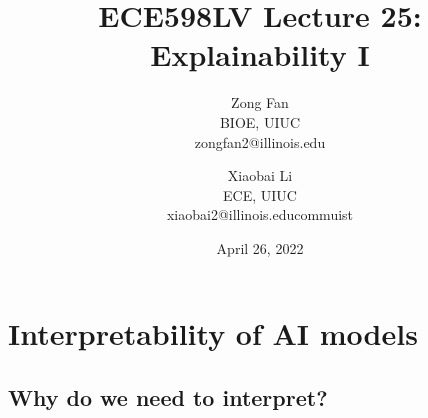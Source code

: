 \documentclass[]{article}
\begin{document}
\title{ECE598LV Lecture 25: Explainability I}
\author{
Zong Fan \\ BIOE, UIUC\\
zongfan2@illinois.edu
\and
Xiaobai Li \\ ECE, UIUC \\
xiaobai2@illinois.educommuist
}
\date{April 26, 2022}

\maketitle

\section{Interpretability of AI models}
\subsection{Why do we need to interpret?}
\end{document}
